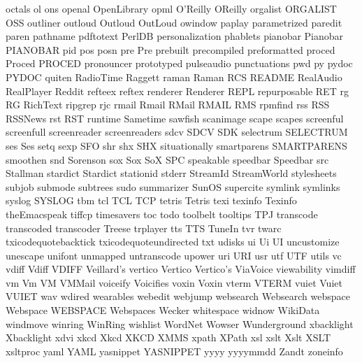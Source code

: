 octals
ol
ons
openal
OpenLibrary
opml
O'Reilly
OReilly
orgalist
ORGALIST
OSS
outliner
outloud
Outloud
OutLoud
owindow
paplay
parametrized
paredit
paren
pathname
pdftotext
PerlDB
personalization
phablets
pianobar
Pianobar
PIANOBAR
pid
pos
posn
pre
Pre
prebuilt
precompiled
preformatted
proced
Proced
PROCED
pronouncer
prototyped
pulseaudio
punctuations
pwd
py
pydoc
PYDOC
quiten
RadioTime
Raggett
raman
Raman
RCS
README
RealAudio
RealPlayer
Reddit
refteex
reftex
renderer
Renderer
REPL
repurposable
RET
rg
RG
RichText
ripgrep
rjc
rmail
Rmail
RMail
RMAIL
RMS
rpmfind
rss
RSS
RSSNews
rst
RST
runtime
Sametime
sawfish
scanimage
scape
scapes
screenful
screenfull
screenreader
screenreaders
sdcv
SDCV
SDK
selectrum
SELECTRUM
ses
Ses
setq
sexp
SFO
shr
shx
SHX
situationally
smartparens
SMARTPARENS
smoothen
snd
Sorenson
sox
Sox
SoX
SPC
speakable
speedbar
Speedbar
src
Stallman
stardict
Stardict
stationid
stderr
StreamId
StreamWorld
stylesheets
subjob
submode
subtrees
sudo
summarizer
SunOS
supercite
symlink
symlinks
syslog
SYSLOG
tbm
tcl
TCL
TCP
tetris
Tetris
texi
texinfo
Texinfo
theEmacspeak
tiffcp
timesavers
toc
todo
toolbelt
tooltips
TPJ
transcode
transcoded
transcoder
Treese
trplayer
tts
TTS
TuneIn
tvr
twarc
txicodequotebacktick
txicodequoteundirected
txt
udisks
ui
Ui
UI
uncustomize
unescape
unifont
unmapped
untranscode
upower
uri
URI
usr
utf
UTF
utils
vc
vdiff
Vdiff
VDIFF
Veillard's
vertico
Vertico
Vertico's
ViaVoice
viewability
vimdiff
vm
Vm
VM
VMMail
voiceify
Voicifies
voxin
Voxin
vterm
VTERM
vuiet
Vuiet
VUIET
wav
wdired
wearables
webedit
webjump
websearch
Websearch
webspace
Webspace
WEBSPACE
Webspaces
Wecker
whitespace
widnow
WikiData
windmove
winring
WinRing
wishlist
WordNet
Wowser
Wunderground
xbacklight
Xbacklight
xdvi
xkcd
Xkcd
XKCD
XMMS
xpath
XPath
xsl
xslt
Xslt
XSLT
xsltproc
yaml
YAML
yasnippet
YASNIPPET
yyyy
yyyymmdd
Zandt
zoneinfo
